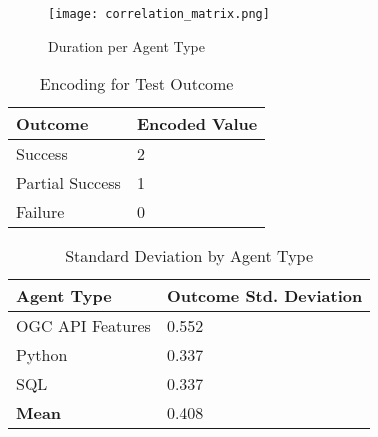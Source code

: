 \begin{figure}[htbp]
    \centering
    \texttt{[image: correlation\_matrix.png]}
    \caption{Duration per Agent Type}
    \label{fig:correlation-matrix}
\end{figure}

\begin{table}[htbp]
    \centering
    \caption{Encoding for Test Outcome}
    \label{tbl:outcome-encoding}
    \begin{tabularx}{0.5\textwidth}{XX}
        \toprule
        Outcome         & Encoded Value \\
        \midrule
        Success         & 2             \\
        Partial Success & 1             \\
        Failure         & 0             \\
        \bottomrule
    \end{tabularx}
\end{table}

\begin{table}[htbp]
    \centering
    \caption{Standard Deviation by Agent Type}
    \label{tbl:stddev-by-agent-type}
    \begin{tabularx}{0.7\textwidth}{XX}
        \toprule
        Agent Type       & Outcome Std. Deviation \\
        \midrule
        OGC API Features & 0.552                  \\
        Python           & 0.337                  \\
        SQL              & 0.337                  \\
        \midrule
        \textbf{Mean}    & 0.408                  \\
        \bottomrule
    \end{tabularx}
\end{table}

